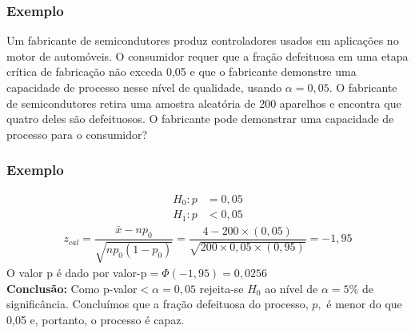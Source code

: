 \documentclass[14pt,aspectratio=1610]{beamer}
\newcommand{\bx}{\ensuremath{\bar{x}}}
\newcommand{\Ho}{\ensuremath{H_{0}}}
\begin{document}
\begin{frame}{}
\frametitle{Exemplo}
\begin{block}{}
\justifying
Um fabricante de semicondutores produz controladores usados em aplicações no motor de automóveis. O consumidor requer que a fração de\-fei\-tuo\-sa em uma etapa crítica de fabricação não exceda 0,05 e que o fabricante demonstre uma capacidade de processo nesse nível de qualidade, usando $\alpha = 0,05.$ O fabricante de 
semicondutores retira uma amostra aleatória de 200 aparelhos e encontra que quatro deles são defeituosos. O fabricante pode demonstrar uma capacidade de processo 
para o consumidor?
\end{block}
\end{frame}

\begin{frame}{}
\frametitle{Exemplo}
\begin{block}{}
\justifying
\begin{align*}
H_{0}: p&=0,05 \\ 
H_{1}: p&<0,05
\end{align*}
\begin{align}
z_{cal}=\dfrac{\bx-np_{0}}{\sqrt{np_{0}(1 - p_{0})}}=\dfrac{4-200\times(0,05)}{\sqrt{200\times0,05\times(0,95)}}=-1,95
\end{align}
O valor p é dado por valor-p$=\Phi(-1,95)=0,0256$\\
\textbf{Conclusão:} Como p-valor$<\alpha=0,05$ rejeita-se $\Ho$ ao nível de $\alpha=5\%$ de significância. Concluímos que a fração defeituosa do processo, $p,$ é 
menor do que 0,05 e, portanto, o processo é capaz.
\end{block}
\end{frame}
\end{document}
